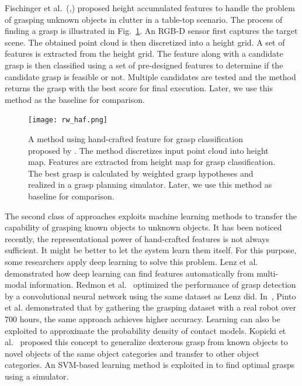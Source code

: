 Fischinger et al.~(\cite{Fischinger2012},\cite{Fischinger2015}) proposed height accumulated features to handle the problem of grasping unknown objects in clutter in a table-top scenario. The process of finding a grasp is illustrated in Fig.~\ref{fig:rw_haf}. An RGB-D sensor first captures the target scene. The obtained point cloud is then discretized into a height grid. A set of features is extracted from the height grid. The feature along with a candidate grasp is then classified using a set of pre-designed features to determine if the candidate grasp is feasible or not. Multiple candidates are tested and the method returns the grasp with the best score for final execution. Later, we use this method as the baseline for comparison. 
\begin{figure}[!htbp]
\centering
\texttt{[image: rw\_haf.png]}
\captionsetup{justification=raggedright}
\caption{ A method using hand-crafted feature for grasp classification proposed by \cite{Fischinger2015}. The method discretizes input point cloud into height map. Features are extracted from height map for grasp classification. The best grasp is calculated by weighted grasp hypotheses and realized in a grasp planning simulator. Later, we use this method as baseline for comparison.} 
\label{fig:rw_haf}       %
\end{figure} 

The second class of approaches exploits machine learning methods to transfer the capability of  grasping known objects to unknown objects. It has been noticed recently, the representational power of hand-crafted features is not always sufficient. It might be better to let the system learn them itself. For this purpose, some researchers apply deep learning to solve this problem. Lenz et al.~\cite{Lenz2015} demonstrated how deep learning can find features automatically from multi-modal information. Redmon et al.~\cite{Redmon2015} optimized the performance of grasp detection by a convolutional neural network using the same dataset as Lenz did. In~\cite{Pinto2015}, Pinto et al. demonstrated that by gathering the grasping dataset with a real robot over 700 hours, the same approach achieves higher accuracy. Learning can also be exploited to approximate the probability density of contact models. Kopicki et al.~\cite{Kopicki2014} proposed this concept to generalize dexterous grasp from known objects to novel objects of the same object categories and transfer to other object categories. An SVM-based learning method is exploited in \cite{Pelossof2004} to find optimal grasps using a simulator.

